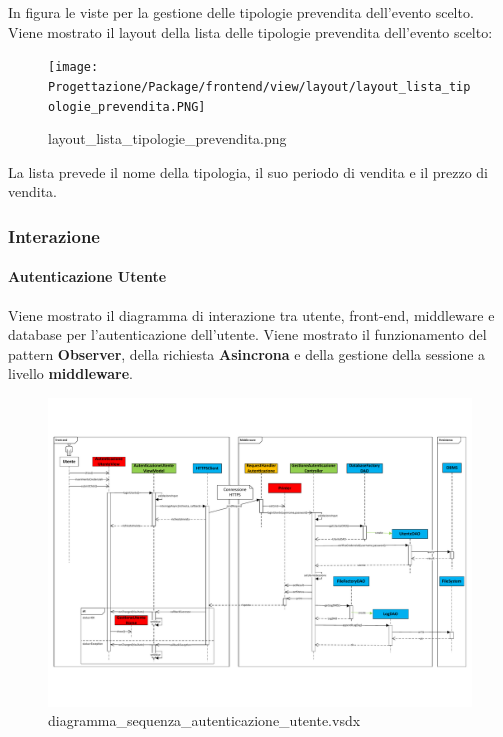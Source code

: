 \documentclass[a4paper]{article}
\begin{document}
In figura le viste per la gestione delle tipologie prevendita dell'evento scelto. Viene mostrato il layout della lista delle tipologie prevendita dell'evento scelto:

\begin{figure}[H]
    \texttt{[image: Progettazione/Package/frontend/view/layout/layout\_lista\_tipologie\_prevendita.PNG]}
    \centering
    \caption{layout\_lista\_tipologie\_prevendita.png}
\end{figure}

La lista prevede il nome della tipologia, il suo periodo di vendita e il prezzo di vendita.

\newpage

\subsubsection{Interazione}

\paragraph{Autenticazione Utente} Viene mostrato il diagramma di interazione tra utente, front-end, middleware e database per l'autenticazione dell'utente. Viene mostrato il funzionamento del pattern \textbf{Observer}, della richiesta \textbf{Asincrona} e della gestione della sessione a livello \textbf{middleware}.


\begin{figure}[H]
    \includegraphics[angle=90,scale=0.55]{Progettazione/Interazione/diagramma_sequenza_autenticazione_utente.pdf}
    \centering
    \caption{diagramma\_sequenza\_autenticazione\_utente.vsdx}
\end{figure}
\end{document}
